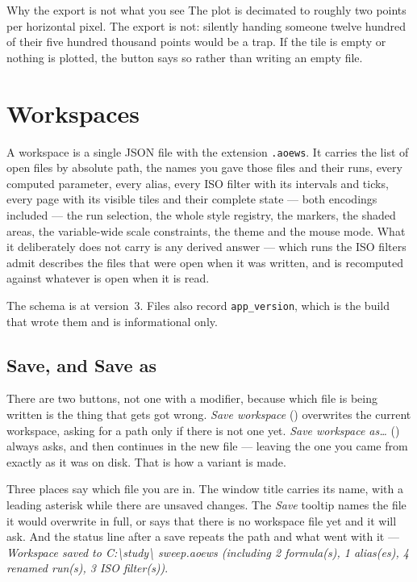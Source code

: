 \documentclass[11pt,a4paper,oneside]{report}
\newcommand{\code}[1]{\texttt{#1}}
\newcommand{\key}[1]{\textsf{\small\fbox{#1}}}
\begin{document}
\begin{aoenote}{Why the export is not what you see}
The plot is decimated to roughly two points per horizontal pixel. The export is
not: silently handing someone twelve hundred of their five hundred thousand
points would be a trap. If the tile is empty or nothing is plotted, the button
says so rather than writing an empty file.
\end{aoenote}

\section{Workspaces}
\label{sec:workspaces}

A workspace is a single JSON file with the extension \code{.aoews}. It carries
the list of open files by absolute path, the names you gave those files and their
runs, every computed parameter, every alias, every ISO filter with its intervals
and ticks, every page with its visible tiles and their complete state --- both
encodings included --- the run selection, the whole style registry, the markers,
the shaded areas, the variable-wide scale constraints, the theme and the mouse
mode. What it deliberately does not carry is any derived answer --- which runs
the ISO filters admit describes the files that were open when it was written, and
is recomputed against whatever is open when it is read.

The schema is at version~3. Files also record \code{app\_version}, which is the
build that wrote them and is informational only.

\subsection{Save, and Save as}

There are two buttons, not one with a modifier, because which file is being
written is the thing that gets got wrong. \emph{Save workspace} (\key{Ctrl+S})
overwrites the current workspace, asking for a path only if there is not one yet.
\emph{Save workspace as\ldots} (\key{Ctrl+Shift+S}) always asks, and then
continues in the new file --- leaving the one you came from exactly as it was on
disk. That is how a variant is made.

Three places say which file you are in. The window title carries its name, with a
leading asterisk while there are unsaved changes. The \emph{Save} tooltip names
the file it would overwrite in full, or says that there is no workspace file yet
and it will ask. And the status line after a save repeats the path and what went
with it --- \emph{Workspace saved to C:\textbackslash study\textbackslash
sweep.aoews (including 2 formula(s), 1 alias(es), 4 renamed run(s), 3 ISO
filter(s))}.
\end{document}
